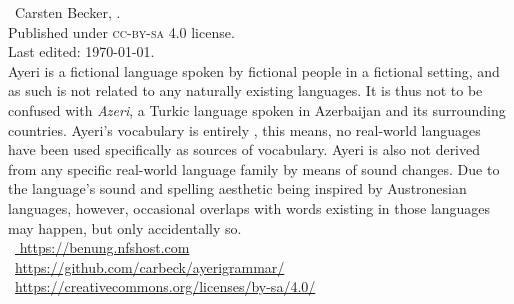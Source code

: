 

\begin{minipage}[b][\textheight][b]{0.67\textwidth}\small
\ccbysa~Carsten Becker, \the\year.\\
Published under \textsc{cc-by-sa} 4.0 license.\\
Last edited: \today{}.\\[.5\baselineskip]


Ayeri is a fictional language spoken by fictional people in a fictional setting, 
and as such is not related to any naturally existing languages. It is thus not 
to be confused with \emph{Azeri}, a Turkic language spoken in Azerbaijan and its 
surrounding countries. Ayeri’s vocabulary is entirely , this 
means, no real-world languages have been used specifically as sources of 
vocabulary. Ayeri is also not derived from any specific real-world language 
family by means of sound changes. Due to the language’s sound and spelling 
aesthetic being inspired by Austronesian languages, however, occasional 
overlaps with words existing in those languages may happen, but only  
accidentally so.\\[.5\baselineskip]

~\href{http://benung.nfshost.com}{%
https://benung.nfshost.com}\\
%
~\href{https://github.com/carbeck/ayerigrammar}
{https://github.com/carbeck/ayerigrammar/}\\
%
~\href{%
https://creativecommons.org/licenses/by-sa/4.0/}%
{https://creativecommons.org/licenses/by-sa/4.0/}%

\end{minipage}
